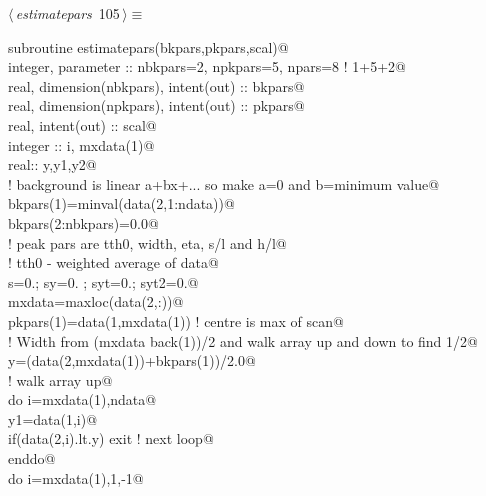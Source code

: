 \documentclass[10pt,a4paper,notitlepage]{article}
\begin{document}
\begin{flushleft} \small
\begin{minipage}{\linewidth}\label{scrap129}\raggedright\small
{} $\langle\,${\it estimatepars}\nobreak\ {\footnotesize {105}}$\,\rangle\equiv$
\vspace{-1ex}
\begin{list}{}{} \item
\mbox{}\verb@      subroutine estimatepars(bkpars,pkpars,scal)@\\
\mbox{}\verb@      integer, parameter :: nbkpars=2, npkpars=5, npars=8 ! 1+5+2@\\
\mbox{}\verb@      real, dimension(nbkpars), intent(out) :: bkpars@\\
\mbox{}\verb@      real, dimension(npkpars), intent(out) :: pkpars@\\
\mbox{}\verb@      real, intent(out) :: scal@\\
\mbox{}\verb@      integer :: i, mxdata(1)@\\
\mbox{}\verb@      real:: y,y1,y2@\\
\mbox{}\verb@! background is linear a+bx+... so make a=0 and b=minimum value@\\
\mbox{}\verb@      bkpars(1)=minval(data(2,1:ndata))@\\
\mbox{}\verb@      bkpars(2:nbkpars)=0.0@\\
\mbox{}\verb@! peak pars are tth0, width, eta, s/l and h/l@\\
\mbox{}\verb@! tth0 - weighted average of data@\\
\mbox{}\verb@      s=0.; sy=0. ; syt=0.; syt2=0.@\\
\mbox{}\verb@      mxdata=maxloc(data(2,:))@\\
\mbox{}\verb@      pkpars(1)=data(1,mxdata(1))      ! centre is max of scan@\\
\mbox{}\verb@! Width from (mxdata back(1))/2  and walk array up and down to find 1/2@\\
\mbox{}\verb@      y=(data(2,mxdata(1))+bkpars(1))/2.0@\\
\mbox{}\verb@! walk array up@\\
\mbox{}\verb@      do i=mxdata(1),ndata@\\
\mbox{}\verb@        y1=data(1,i)@\\
\mbox{}\verb@        if(data(2,i).lt.y) exit ! next loop@\\
\mbox{}\verb@      enddo@\\
\mbox{}\verb@      do i=mxdata(1),1,-1@\\

\end{list}
\end{minipage}
\end{flushleft}
\end{document}
